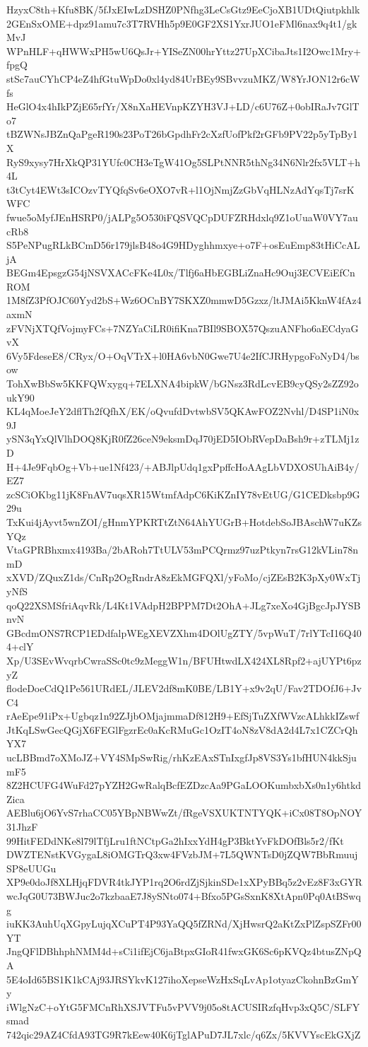 HzyxC8th+Kfu8BK/5fJxEIwLzDSHZ0PNfhg3LeCsGtz9EeCjoXB1UDtQiutpkhlk
2GEnSxOME+dpz91amu7c3T7RVHh5p9E0GF2XS1YxrJUO1eFMl6nax9q4t1/gkMvJ
WPnHLF+qHWWxPH5wU6QsJr+YISeZN00hrYttz27UpXCibaJts1I2Owc1Mry+fpgQ
stSc7auCYhCP4eZ4hfGtuWpDo0xl4yd84UrBEy9SBvvzuMKZ/W8YrJON12r6cWfs
HeGlO4x4hIkPZjE65rfYr/X8nXaHEVnpKZYH3VJ+LD/c6U76Z+0obIRaJv7GlTo7
tBZWNsJBZnQaPgeR190s23PoT26bGpdhFr2cXzfUofPkf2rGFb9PV22p5yTpBy1X
RyS9xysy7HrXkQP31YUfc0CH3eTgW41Og5SLPtNNR5thNg34N6Nlr2fx5VLT+h4L
t3tCyt4EWt3sICOzvTYQfqSv6eOXO7vR+l1OjNmjZzGbVqHLNzAdYqsTj7srKWFC
fwue5oMyfJEnHSRP0/jALPg5O530iFQSVQCpDUFZRHdxlq9Z1oUuaW0VY7aucRb8
S5PeNPugRLkBCmD56r179jlsB48o4G9HDyghhmxye+o7F+osEuEmp83tHiCcALjA
BEGm4EpsgzG54jNSVXACcFKe4L0x/Tlfj6aHbEGBLiZnaHc9Ouj3ECVEiEfCnROM
1M8fZ3PfOJC60Yyd2bS+Wz6OCnBY7SKXZ0mmwD5Gzxz/ltJMAi5KknW4fAz4axmN
zFVNjXTQfVojmyFCs+7NZYaCiLR0ifiKna7BIl9SBOX57QszuANFho6aECdyaGvX
6Vy5FdeseE8/CRyx/O+OqVTrX+l0HA6vbN0Gwe7U4e2IfCJRHypgoFoNyD4/bsow
TohXwBbSw5KKFQWxygq+7ELXNA4bipkW/bGNsz3RdLcvEB9cyQSy2sZZ92oukY90
KL4qMoeJeY2dflTh2fQfhX/EK/oQvufdDvtwbSV5QKAwFOZ2Nvhl/D4SP1iN0x9J
ySN3qYxQlVlhDOQ8KjR0fZ26ceN9eksmDqJ70jED5IObRVepDaBsh9r+zTLMj1zD
H+4Je9FqbOg+Vb+ue1Nf423/+ABJlpUdq1gxPpffcHoAAgLbVDXOSUhAiB4y/EZ7
zcSCiOKbg11jK8FnAV7uqsXR15WtmfAdpC6KiKZnIY78vEtUG/G1CEDksbp9G29u
TxKui4jAyvt5wnZOI/gHnmYPKRTtZtN64AhYUGrB+HotdebSoJBAschW7uKZsYQz
VtaGPRBhxmx4193Ba/2bARoh7TtULV53mPCQrmz97uzPtkyn7rsG12kVLin78nmD
xXVD/ZQuxZ1ds/CnRp2OgRndrA8zEkMGFQXl/yFoMo/cjZEsB2K3pXy0WxTjyNfS
qoQ22XSMSfriAqvRk/L4Kt1VAdpH2BPPM7Dt2OhA+JLg7xeXo4GjBgcJpJYSBnvN
GBcdmONS7RCP1EDdfalpWEgXEVZXhm4DOlUgZTY/5vpWuT/7rlYTcI16Q404+clY
Xp/U3SEvWvqrbCwraSSc0tc9zMeggW1n/BFUHtwdLX424XL8Rpf2+ajUYPt6pzyZ
flodeDoeCdQ1Pe561URdEL/JLEV2df8mK0BE/LB1Y+x9v2qU/Fav2TDOfJ6+JvC4
rAeEpe91iPx+Ugbqz1n92ZJjbOMjajmmaDf812H9+EfSjTuZXfWVzcALhkkIZswf
JtKqLSwGecQGjX6FEGlFgzrEc0aKcRMuGc1OzIT4oN8zV8dA2d4L7x1CZCrQhYX7
ucLBBmd7oXMoJZ+VY4SMpSwRig/rhKzEAxSTnIxgfJp8VS3Ys1bfHUN4kkSjumF5
8Z2HCUFG4WuFd27pYZH2GwRalqBcfEZDzcAa9PGaLOOKumbxbXs0n1y6htkdZica
AEBlu6jO6YvS7rhaCC05YBpNBWwZt/fRgeVSXUKTNTYQK+iCx08T8OpNOY31JhzF
99HitFEDdNKe8l79lTfjLru1ftNCtpGa2hIxxYdH4gP3BktYvFkDOfBls5r2/fKt
DWZTENstKVGygaL8iOMGTrQ3xw4FVzbJM+7L5QWNTsD0jZQW7BbRmuujSP8eUUGu
XP9e0doJf8XLHjqFDVR4tkJYP1rq2O6rdZjSjkinSDe1xXPyBBq5z2vEz8F3xGYR
wcJqG0U73BWJuc2o7kzbaaE7J8ySNto074+Bfxo5PGsSxnK8XtApn0Pq0AtBSwqg
iuKK3AuhUqXGpyLujqXCuPT4P93YaQQ5fZRNd/XjHwsrQ2aKtZxPlZspSZFr00YT
JngQFlDBhhphNMM4d+sCi1ifEjC6jaBtpxGIoR41fwxGK6Sc6pKVQz4btusZNpQA
5E4oId65BS1K1kCAj93JRSYkvK127ihoXepseWzHxSqLvAp1otyazCkohnBzGmYy
iWlgNzC+oYtG5FMCnRhXSJVTFu5vPVV9j05o8tACUSIRzfqHvp3xQ5C/SLFYsmad
742qic29AZ4CfdA93TG9R7kEew40K6jTglAPuD7JL7xlc/q6Zx/5KVVYscEkGXjZ
